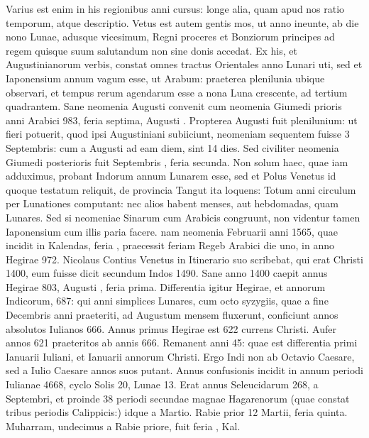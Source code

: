 %
Varius est enim in his regionibus
anni cursus: longe alia, quam apud nos ratio temporum, atque
descriptio.
Vetus est autem gentis mos, ut anno ineunte, ab die nono
Lunae, adusque vicesimum, Regni proceres et Bonziorum principes
ad regem quisque suum salutandum non sine donis accedat.
Ex his, et Augustinianorum verbis, constat omnes tractus Orientales
anno Lunari uti, sed et Iaponensium annum vagum esse, ut Arabum:
praeterea plenilunia ubique observari, et tempus rerum agendarum
esse a nona Luna crescente, ad tertium quadrantem.
Sane
neomenia Augusti convenit cum neomenia Giumedi prioris anni
Arabici 983, feria septima, Augusti .
Propterea  Augusti fuit
plenilunium: ut fieri potuerit, quod ipsi Augustiniani subiiciunt,
neomeniam sequentem fuisse 3 Septembris: cum a  Augusti ad
eam diem, sint 14 dies.
Sed civiliter neomenia Giumedi posterioris
fuit Septembris , feria secunda.
Non solum haec, quae iam adduximus,
probant Indorum annum Lunarem esse, sed et Polus Venetus
id quoque testatum reliquit, de provincia Tangut ita loquens:
Totum anni circulum per Lunationes computant: nec alios habent
menses, aut hebdomadas, quam Lunares.
Sed si neomeniae Sinarum
cum Arabicis congruunt, non videntur tamen Iaponensium cum illis
paria facere.
nam neomenia Februarii anni 1565, quae incidit in
Kalendas, feria , praecessit feriam Regeb Arabici die uno, in anno
Hegirae 972.
Nicolaus Contius Venetus in Itinerario suo scribebat, qui
erat Christi 1400, eum fuisse dicit secundum Indos 1490.
Sane anno
1400 caepit annus Hegirae 803, Augusti , feria prima.
Differentia
igitur Hegirae, et annorum Indicorum, 687: qui anni simplices Lunares,
cum octo syzygiis, quae a fine Decembris anni praeteriti, ad Augustum
mensem fluxerunt, conficiunt annos absolutos Iulianos 666.
Annus
primus Hegirae est 622 currens Christi.
Aufer annos 621 praeteritos %
ab annis 666.
Remanent anni 45: quae est differentia primi Ianuarii
Iuliani, et Ianuarii annorum Christi.
Ergo Indi non ab Octavio
Caesare, sed a Iulio Caesare annos suos putant.
Annus confusionis
incidit in annum periodi Iulianae 4668, cyclo Solis 20, Lunae 13.
Erat annus Seleucidarum 268, a Septembri, et proinde 38 periodi
secundae magnae Hagarenorum (quae constat tribus periodis Calippicis:)
idque a Martio.
Rabie prior 12 Martii, feria quinta.
Muharram,
undecimus a Rabie priore, fuit feria , Kal. %
